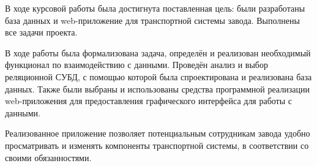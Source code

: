 В ходе курсовой работы была достигнута поставленная цель: были разработаны база данных и web-приложение для транспортной системы завода. Выполнены все задачи проекта.

В ходе работы была формализована задача, определён и реализован необходимый функционал по взаимодействию с данными. Проведён анализ и выбор реляционной СУБД, с помощью которой была спроектирована и реализована база данных. Также были выбраны и использованы средства программной реализации web-приложения для предоставления графического интерфейса для работы с данными.

Реализованное приложение позволяет потенциальным сотрудникам завода удобно просматривать и изменять компоненты транспортной системы, в соответствии со своими обязанностями.
